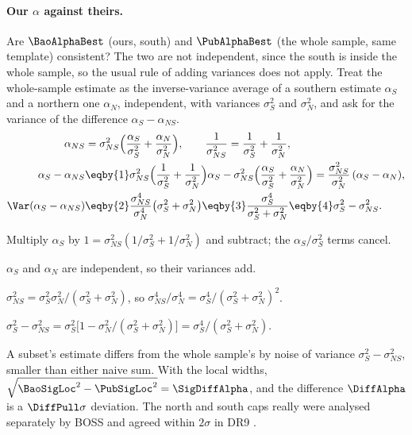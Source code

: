 \paragraph{Our $\alpha$ against theirs.} Are $\BaoAlphaBest$ (ours, south) and
$\PubAlphaBest$ (the whole sample, same template) consistent? The two are not
independent, since the south is inside the whole sample, so the usual rule of adding
variances does not apply. Treat the whole-sample estimate as the inverse-variance
average of a southern estimate $\alpha_S$ and a northern one $\alpha_N$, independent,
with variances $\sigma_S^2$ and $\sigma_N^2$, and ask for the variance of the
difference $\alpha_S-\alpha_{NS}$.
\begin{align}
  \alpha_{NS}&=\sigma_{NS}^2\Bigl(\frac{\alpha_S}{\sigma_S^2}+\frac{\alpha_N}{\sigma_N^2}\Bigr),
  \qquad \frac{1}{\sigma_{NS}^2}=\frac{1}{\sigma_S^2}+\frac{1}{\sigma_N^2},
  \nonumber\\
  \alpha_S-\alpha_{NS}
  &\eqby{1}\sigma_{NS}^2\Bigl(\frac{1}{\sigma_S^2}+\frac{1}{\sigma_N^2}\Bigr)\alpha_S
   -\sigma_{NS}^2\Bigl(\frac{\alpha_S}{\sigma_S^2}+\frac{\alpha_N}{\sigma_N^2}\Bigr)
   =\frac{\sigma_{NS}^2}{\sigma_N^2}\,(\alpha_S-\alpha_N),
  \nonumber\\
  \Var(\alpha_S-\alpha_{NS})
  &\eqby{2}\frac{\sigma_{NS}^4}{\sigma_N^4}\bigl(\sigma_S^2+\sigma_N^2\bigr)
   \eqby{3}\frac{\sigma_S^4}{\sigma_S^2+\sigma_N^2}
   \eqby{4}\sigma_S^2-\sigma_{NS}^2 .
  \label{13c:eq:subset-diff}
\end{align}
\begin{explain}
  \item Multiply $\alpha_S$ by $1=\sigma_{NS}^2(1/\sigma_S^2+1/\sigma_N^2)$ and
        subtract; the $\alpha_S/\sigma_S^2$ terms cancel.
  \item $\alpha_S$ and $\alpha_N$ are independent, so their variances add.
  \item $\sigma_{NS}^2=\sigma_S^2\sigma_N^2/(\sigma_S^2+\sigma_N^2)$, so
        $\sigma_{NS}^4/\sigma_N^4=\sigma_S^4/(\sigma_S^2+\sigma_N^2)^2$.
  \item $\sigma_S^2-\sigma_{NS}^2=\sigma_S^2\bigl[1-\sigma_N^2/(\sigma_S^2+\sigma_N^2)\bigr]
        =\sigma_S^4/(\sigma_S^2+\sigma_N^2)$.
\end{explain}
A subset's estimate differs from the whole sample's by noise of variance
$\sigma_S^2-\sigma_{NS}^2$, smaller than either naive sum. With the local widths,
$\sqrt{\BaoSigLoc^2-\PubSigLoc^2}=\SigDiffAlpha$, and the difference
$\DiffAlpha$ is a $\DiffPull\sigma$ deviation. The north and south caps really were
analysed separately by BOSS and agreed within $2\sigma$ in DR9 \cite{Ross2012}.

